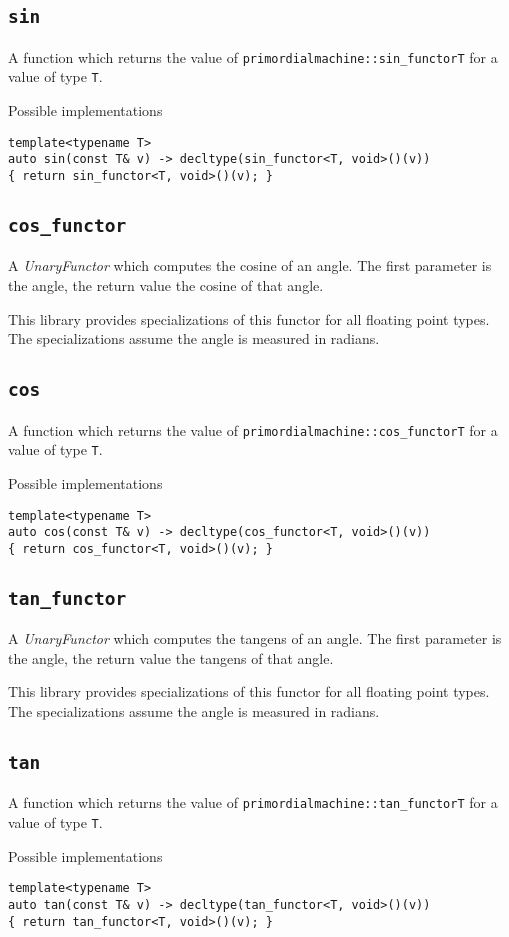 \documentclass[oneside]{article}
\begin{document}
\subsection{\texttt{sin}}
A function which returns the value of \texttt{primordialmachine::sin\_functor\textlangle T\textrangle}
for a value of type \texttt{T}.

\noindent{}Possible implementations
\begin{verbatim}
template<typename T>
auto sin(const T& v) -> decltype(sin_functor<T, void>()(v))
{ return sin_functor<T, void>()(v); }
\end{verbatim}
\subsection{\texttt{cos\_functor}}
A \textit{UnaryFunctor} which computes the
cosine
of an angle.
The first parameter is the angle, the return value the cosine of that angle.

\noindent{}This library provides specializations of this functor for all floating point types.
The specializations assume the angle is measured in radians.

\subsection{\texttt{cos}}
A function which returns the value of \texttt{primordialmachine::cos\_functor\textlangle T\textrangle}
for a value of type \texttt{T}.

\noindent{}Possible implementations
\begin{verbatim}
template<typename T>
auto cos(const T& v) -> decltype(cos_functor<T, void>()(v))
{ return cos_functor<T, void>()(v); }
\end{verbatim}
\subsection{\texttt{tan\_functor}}
A \textit{UnaryFunctor} which computes the
tangens
of an angle.
The first parameter is the angle, the return value the tangens of that angle.

\noindent{}This library provides specializations of this functor for all floating point types.
The specializations assume the angle is measured in radians.

\subsection{\texttt{tan}}
A function which returns the value of \texttt{primordialmachine::tan\_functor\textlangle T\textrangle}
for a value of type \texttt{T}.

\noindent{}Possible implementations
\begin{verbatim}
template<typename T>
auto tan(const T& v) -> decltype(tan_functor<T, void>()(v))
{ return tan_functor<T, void>()(v); }
\end{verbatim}
\end{document}
